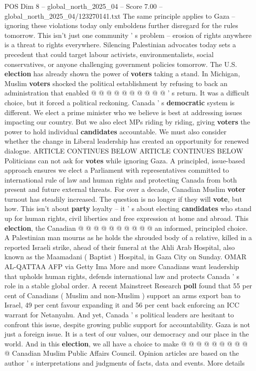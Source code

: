 \begin{textsample}{POS Dim 8 – global\_north\_2025\_04 – Score 7.00 – global\_north\_2025\_04/123270141.txt}
The same principle applies to Gaza -- ignoring these violations today only emboldens further disregard for the rules tomorrow.
This isn't just one community ' s problem -- erosion of rights anywhere is a threat to rights everywhere.
Silencing Palestinian advocates today sets a precedent that could target labour activists, environmentalists, social conservatives, or anyone challenging government policies tomorrow.
The U.S. \textbf{election} has already shown the power of \textbf{voters} taking a stand.
In Michigan, Muslim \textbf{voters} shocked the political establishment by refusing to back an administration that enabled @ @ @ @ @ @ @ @ @ @ ' s return.
It was a difficult choice, but it forced a political reckoning.
Canada ' s \textbf{democratic} system is different.
We elect a prime minister who we believe is best at addressing issues impacting our country.
But we also elect MPs riding by riding, giving \textbf{voters} the power to hold individual \textbf{candidates} accountable.
We must also consider whether the change in Liberal leadership has created an opportunity for renewed dialogue.
ARTICLE CONTINUES BELOW ARTICLE CONTINUES BELOW Politicians can not ask for \textbf{votes} while ignoring Gaza.
A principled, issue-based approach ensures we elect a Parliament with representatives committed to international rule of law and human rights and protecting Canada from both present and future external threats.
For over a decade, Canadian Muslim \textbf{voter} turnout has steadily increased.
The question is no longer if they will \textbf{vote}, but how.
This isn't about \textbf{party} loyalty -- it ' s about electing \textbf{candidates} who stand up for human rights, civil liberties and free expression at home and abroad.
This \textbf{election}, the Canadian @ @ @ @ @ @ @ @ @ @ an informed, principled choice.
A Palestinian man mourns as he holds the shrouded body of a relative, killed in a reported Israeli strike, ahead of their funeral at the Ahli Arab Hospital, also known as the Maamadani ( Baptist ) Hospital, in Gaza City on Sunday.
OMAR AL-QATTAA AFP via Getty Ima More and more Canadians want leadership that upholds human rights, defends international law and protects Canada ' s role in a stable global order.
A recent Mainstreet Research \textbf{poll} found that 55 per cent of Canadians ( Muslim and non-Muslim ) support an arms export ban to Israel, 49 per cent favour expanding it and 56 per cent back enforcing an ICC warrant for Netanyahu.
And yet, Canada ' s political leaders are hesitant to confront this issue, despite growing public support for accountability.
Gaza is not just a foreign issue.
It is a test of our values, our democracy and our place in the world.
And in this \textbf{election}, we all have a choice to make @ @ @ @ @ @ @ @ @ @ Canadian Muslim Public Affairs Council.
Opinion articles are based on the author ' s interpretations and judgments of facts, data and events.
More details

\end{textsample}

